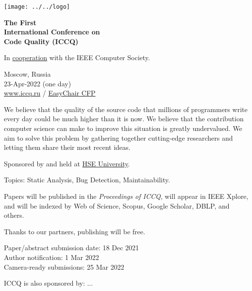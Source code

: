 \documentclass[12pt,oneside]{article}
\begin{document}
\selectfont
\raggedbottom
\raggedright
\setlength{\topskip}{6pt}
\setlength{\parindent}{0pt} %
\setlength{\parskip}{6pt} %

\begin{wraptable}{r}{1.2in}%
  \raggedleft%
  \texttt{[image: ../../logo]}
\end{wraptable}

\textcolor{xred}{\bfseries
{\large The First} \\
{\Large International Conference on\\[3pt]
Code Quality (ICCQ)}}

In
\href{https://conferences.ieee.org/conferences_events/conferences/conferencedetails/51190}{cooperation}
with the IEEE Computer Society.

\vspace{6pt}

Moscow, Russia \\
23-Apr-2022 (one day) \\
\href{https://www.iccq.ru}{www.iccq.ru} / \href{https://easychair.org/cfp/ICCQ20}{EasyChair CFP}\\

\vspace{12pt}

\newcommand\person[2]{
  \begin{minipage}[t]{0.22\textwidth}\raggedright%
  \texttt{[image: ../../images/\#1]} \\
  {\small #2}%
  \end{minipage}
}

\vspace{6pt}

We believe that the quality of the source code that millions of programmers
write every day could be much higher than it is now. We believe that the
contribution computer science can make to improve this situation is greatly
undervalued. We aim to solve this problem by gathering
together cutting-edge researchers and letting them share their most recent ideas.

Sponsored by and held at \href{https://www.hse.ru/en/}{HSE University}.

Topics: Static Analysis, Bug Detection, Maintainability.

Papers will be published in the \textit{Proceedings of ICCQ},
will appear in IEEE Xplore\textsuperscript{\textregistered},
and will be indexed by Web of Science, Scopus, Google Scholar, DBLP, and others.

Thanks to our partners, publishing will be free.

\vspace{6pt}

Paper/abstract submission date: 18 Dec 2021 \\
Author notification: 1 Mar 2022 \\
Camera-ready submissions: 25 Mar 2022

\vspace{6pt}

\begin{adjustwidth}{0pt}{1in}
ICCQ is also sponsored by: ...
\end{adjustwidth}
\end{document}

